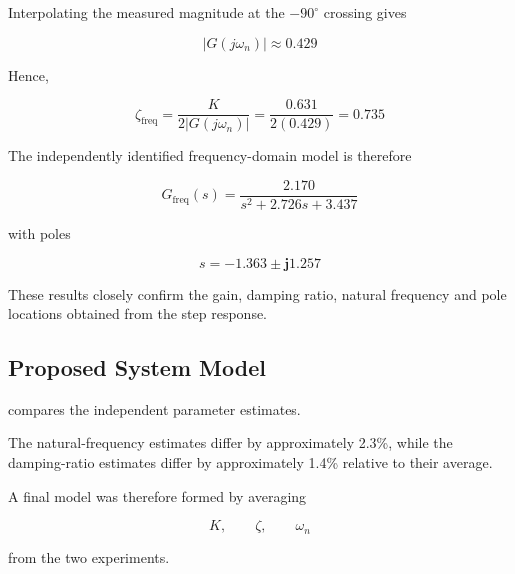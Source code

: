 \documentclass[12pt,a4paper]{article}
\begin{document}
Interpolating the measured magnitude at the $-90^\circ$ crossing
gives

\begin{equation}
    |G(j\omega_n)|
    \approx \mathbf{0.429}
    \tag{36}
\end{equation}

\newpage

Hence,

\begin{equation}
    \zeta_{\mathrm{freq}}
    = \frac{K}{2|G(j\omega_n)|}
    = \frac{0.631}{2(0.429)}
    = \mathbf{0.735}
    \tag{37}
\end{equation}

The independently identified frequency-domain model is therefore

\begin{equation}
    \boxed{
        G_{\mathrm{freq}}(s)
        =
        \frac{2.170}
        {s^2+2.726s+3.437}
    }
    \tag{38}
    \label{eq:gfreq}
\end{equation}

with poles

\begin{equation}
    s
    = \mathbf{-1.363 \pm j1.257}
    \tag{39}
\end{equation}

These results closely confirm the gain, damping ratio, natural
frequency and pole locations obtained from the step response.

\subsection{Proposed System Model}
\label{sec:finalmodel}

 compares the independent parameter
estimates.

The natural-frequency estimates differ by approximately 2.3\%,
while the damping-ratio estimates differ by approximately 1.4\%
relative to their average.

A final model was therefore formed by averaging

\[
K,
\qquad
\zeta,
\qquad
\omega_n
\]

from the two experiments.
\end{document}
